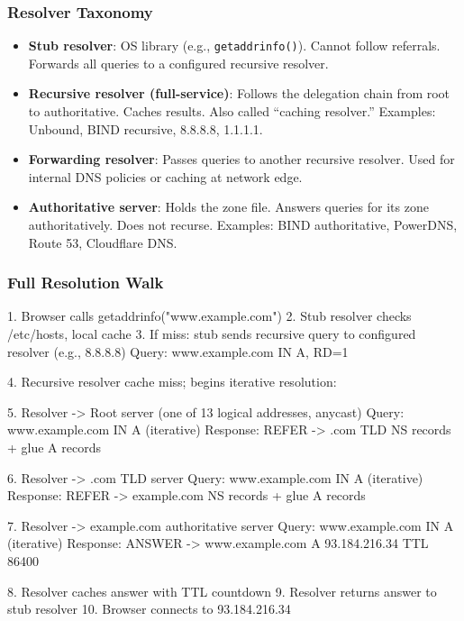 \documentclass[11pt,letterpaper]{article}
\begin{document}
\subsubsection{Resolver Taxonomy}

\begin{itemize}
  \item \textbf{Stub resolver}: OS library (e.g., \texttt{getaddrinfo()}). Cannot follow referrals. Forwards all queries to a configured recursive resolver.
  \item \textbf{Recursive resolver (full-service)}: Follows the delegation chain from root to authoritative. Caches results. Also called ``caching resolver.'' Examples: Unbound, BIND recursive, 8.8.8.8, 1.1.1.1.
  \item \textbf{Forwarding resolver}: Passes queries to another recursive resolver. Used for internal DNS policies or caching at network edge.
  \item \textbf{Authoritative server}: Holds the zone file. Answers queries for its zone authoritatively. Does not recurse. Examples: BIND authoritative, PowerDNS, Route 53, Cloudflare DNS.
\end{itemize}

\subsubsection{Full Resolution Walk}

\begin{asciibox}
1. Browser calls getaddrinfo("www.example.com")
2. Stub resolver checks /etc/hosts, local cache
3. If miss: stub sends recursive query to configured resolver (e.g., 8.8.8.8)
   Query: www.example.com IN A, RD=1

4. Recursive resolver cache miss; begins iterative resolution:

5. Resolver -> Root server (one of 13 logical addresses, anycast)
   Query: www.example.com IN A (iterative)
   Response: REFER -> .com TLD NS records + glue A records

6. Resolver -> .com TLD server
   Query: www.example.com IN A (iterative)
   Response: REFER -> example.com NS records + glue A records

7. Resolver -> example.com authoritative server
   Query: www.example.com IN A (iterative)
   Response: ANSWER -> www.example.com A 93.184.216.34 TTL 86400

8. Resolver caches answer with TTL countdown
9. Resolver returns answer to stub resolver
10. Browser connects to 93.184.216.34
\end{asciibox}
\end{document}

